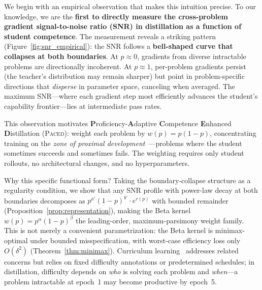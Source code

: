 \documentclass{article}
\begin{document}
We begin with an empirical observation that makes this intuition precise. To our knowledge, we are the \textbf{first to directly measure the cross-problem gradient signal-to-noise ratio (SNR) in distillation as a function of student competence}. The measurement reveals a striking pattern (Figure~\ref{fig:snr_empirical}): the SNR follows a \textbf{bell-shaped curve that collapses at both boundaries}. At $p \approx 0$, gradients from diverse intractable problems are directionally incoherent. At $p \approx 1$, per-problem gradients persist (the teacher's distribution may remain sharper) but point in problem-specific directions that \emph{disperse} in parameter space, canceling when averaged. The maximum SNR---where each gradient step most efficiently advances the student's capability frontier---lies at intermediate pass rates.

This observation motivates \textbf{P}roficiency-\textbf{A}daptive \textbf{C}ompetence \textbf{E}nhanced \textbf{D}istillation (\textsc{Paced}): weight each problem by $w(p) = p(1{-}p)$, concentrating training on the \emph{zone of proximal development}~\citep{vygotsky1978mind}---problems where the student sometimes succeeds and sometimes fails. The weighting requires only student rollouts, no architectural changes, and no hyperparameters.

Why this specific functional form? Taking the boundary-collapse structure as a regularity condition, we show that any SNR profile with power-law decay at both boundaries decomposes as $p^{a'}(1{-}p)^{b'} \cdot e^{r(p)}$ with bounded remainder (Proposition~\ref{prop:representation}), making the Beta kernel $w(p) = p^\alpha(1{-}p)^\beta$ the leading-order, maximum-parsimony weight family. This is not merely a convenient parametrization: the Beta kernel is minimax-optimal under bounded misspecification, with worst-case efficiency loss only $O(\delta^2)$ (Theorem~\ref{thm:minimax}). Curriculum learning~\citep{bengio2009curriculum, kumar2010selfpaced} addresses related concerns but relies on fixed difficulty annotations or predetermined schedules; in distillation, difficulty depends on \emph{who} is solving each problem and \emph{when}---a problem intractable at epoch~1 may become productive by epoch~5.
\end{document}

